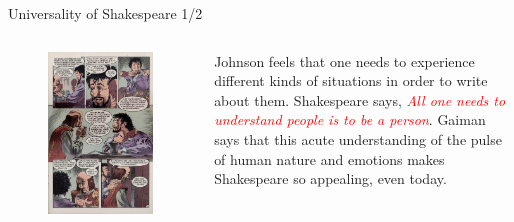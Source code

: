 \documentclass{beamer}
\begin{document}
  \begin{frame}{Universality of Shakespeare 1/2}
    \begin{columns}[c]
      \begin{figure}[htp]
        \begin{center}
          \centering
          \includegraphics[scale=0.3]{universality.jpg}
        \end{center}
      \end{figure}
      Johnson feels that one needs to experience different kinds of situations in order to write about them. Shakespeare says, \textcolor{red}{\emph{All one needs to understand people is to be a person}}. Gaiman says that this acute understanding of the pulse of human nature and emotions makes Shakespeare so appealing, even today.
    \end{columns}
  \end{frame}
\end{document}
